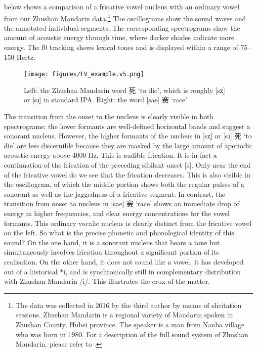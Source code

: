 \documentclass[output=paper,colorlinks,citecolor=brown,chinesefont]{langscibook}
\begin{document}
 below shows a comparison of a fricative vowel nucleus with an ordinary vowel from our Zhushan Mandarin data.\footnote{The data was collected in 2016 by the third author by means of elicitation sessions. Zhushan Mandarin is a regional variety of Mandarin spoken in Zhushan County, Hubei province. The speaker is a man from Nanba village who was born in 1980. For a description of the full sound system of Zhushan Mandarin, please refer to \citet{Chen&Guo_2022}.} The oscillograms show the sound waves and the annotated individual segments. The corresponding spectrograms show the amount of acoustic energy through time, where darker shades indicate more energy. The f0 tracking shows lexical tones and is displayed within a range of 75--150 Hertz.

\begin{figure}
    \texttt{[image: figures/FV\_example.v5.png]}
    \caption{Left: the Zhushan Mandarin word {\cn 死} `to die', which is roughly [sz̩] or [sɹ̩] in standard IPA. Right: the word [sae] {\cn 赛} `race'}
    \label{fig:FV_example}
\end{figure}

The transition from the onset to the nucleus is clearly visible in both spectrograms: the lower formants are well-defined horizontal bands and suggest a sonorant nucleus. However, the higher formants of the nucleus in [sz̩] or [sɹ̩] {\cn 死} `to die' are less discernible because they are masked by the large amount of aperiodic acoustic energy above 4000 Hz. This is audible frication. It is in fact a continuation of the frication of the preceding sibilant onset [s]. Only near the end of the fricative vowel do we see that the frication decreases. This is also visible in the oscillogram, of which the middle portion shows both the regular pulses of a sonorant as well as the jaggedness of a fricative segment. In contrast, the transition from onset to nucleus in [sae] {\cn 赛} `race' shows an immediate drop of energy in higher frequencies, and clear energy concentrations for the vowel formants. This ordinary vocalic nucleus is clearly distinct from the fricative vowel on the left. So what is the precise phonetic and phonological identity of this sound? On the one hand, it is a sonorant nucleus that bears a tone but simultaneously involves frication throughout a significant portion of its realisation. On the other hand, it does not sound like a vowel, it has developed out of a historical *i, and is synchronically still in complementary distribution with Zhushan Mandarin \mbox{/i/}. This illustrates the crux of the matter.
\end{document}
